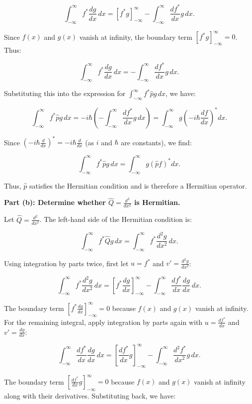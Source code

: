 \[
\int_{-\infty}^\infty f^* \frac{d g}{dx} \, dx = \left[ f^* g \right]_{-\infty}^\infty - \int_{-\infty}^\infty \frac{d f^*}{dx} g \, dx.
\]

Since $f(x)$ and $g(x)$ vanish at infinity, the boundary term $\left[ f^* g \right]_{-\infty}^\infty = 0$. Thus:

\[
\int_{-\infty}^\infty f^* \frac{d g}{dx} \, dx = - \int_{-\infty}^\infty \frac{d f^*}{dx} g \, dx.
\]

Substituting this into the expression for $\int_{-\infty}^\infty f^* \hat{p} g \, dx$, we have:

\[
\int_{-\infty}^\infty f^* \hat{p} g \, dx = -i\hbar \left(- \int_{-\infty}^\infty \frac{d f^*}{dx} g \, dx \right) = \int_{-\infty}^\infty g \left(-i\hbar \frac{d f}{dx}\right)^* dx.
\]

Since $(-i\hbar \frac{d}{dx})^* = -i\hbar \frac{d}{dx}$ (as $i$ and $\hbar$ are constants), we find:

\[
\int_{-\infty}^\infty f^* \hat{p} g \, dx = \int_{-\infty}^\infty g (\hat{p} f)^* dx.
\]

Thus, $\hat{p}$ satisfies the Hermitian condition and is therefore a Hermitian operator. 

\textbf{Part (b): Determine whether $\hat{Q} = \frac{d^2}{dx^2}$ is Hermitian.}

Let $\hat{Q} = \frac{d^2}{dx^2}$. The left-hand side of the Hermitian condition is:

\[
\int_{-\infty}^\infty f^* \hat{Q} g \, dx = \int_{-\infty}^\infty f^* \frac{d^2 g}{dx^2} \, dx.
\]

Using integration by parts twice, first let $u = f^*$ and $v' = \frac{d^2 g}{dx^2}$:

\[
\int_{-\infty}^\infty f^* \frac{d^2 g}{dx^2} \, dx = \left[ f^* \frac{d g}{dx} \right]_{-\infty}^\infty - \int_{-\infty}^\infty \frac{d f^*}{dx} \frac{d g}{dx} \, dx.
\]

The boundary term $\left[ f^* \frac{d g}{dx} \right]_{-\infty}^\infty = 0$ because $f(x)$ and $g(x)$ vanish at infinity. For the remaining integral, apply integration by parts again with $u = \frac{d f^*}{dx}$ and $v' = \frac{d g}{dx}$:

\[
\int_{-\infty}^\infty \frac{d f^*}{dx} \frac{d g}{dx} \, dx = \left[ \frac{d f^*}{dx} g \right]_{-\infty}^\infty - \int_{-\infty}^\infty \frac{d^2 f^*}{dx^2} g \, dx.
\]

The boundary term $\left[ \frac{d f^*}{dx} g \right]_{-\infty}^\infty = 0$ because $f(x)$ and $g(x)$ vanish at infinity along with their derivatives. Substituting back, we have:

